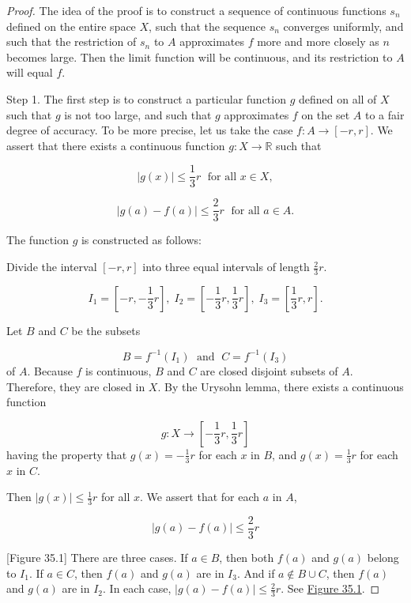 \begin{proof}
 The idea of the proof is to construct a sequence of continuous functions \(s_{n}\) defined on the entire space \(X\), such that the sequence \(s_{n}\) converges uniformly, and such that the restriction of \(s_{n}\) to \(A\) approximates \(f\) more and more closely as \(n\) becomes large. Then the limit function will be continuous, and its restriction to \(A\) will equal \(f\).

Step 1. The first step is to construct a particular function \(g\) defined on all of \(X\) such that \(g\) is not too large, and such that \(g\) approximates \(f\) on the set \(A\) to a fair degree of accuracy. To be more precise, let us take the case \(f : A \rightarrow [ {-r,r}]\). We assert that there exists a continuous function \(g : X \rightarrow \mathbb{R}\) such that

\[
| {g(x) }| \leq \frac{1}{3}r\;\text{ for all }x \in X,
\]

\[
| {g( a) - f( a) }| \leq \frac{2}{3}r\;\text{ for all }a \in A.
\]

The function \(g\) is constructed as follows:

Divide the interval \([ {-r,r}]\) into three equal intervals of length \(\frac{2}{3}r\).

\[
I_{1} = [ {-r, - \frac{1}{3}r}] ,\;I_{2} = [ {-\frac{1}{3}r,\frac{1}{3}r}] ,\;I_{3} = [ {\frac{1}{3}r,r}] .
\]

Let \(B\) and \(C\) be the subsets

\[
B = f^{-1}( I_{1}) \;\text{ and }\;C = f^{-1}( I_{3})
\]
of \(A\). Because \(f\) is continuous, \(B\) and \(C\) are closed disjoint subsets of \(A\). Therefore, they are closed in \(X\). By the Urysohn lemma, there exists a continuous function

\[
g : X \rightarrow [ {-\frac{1}{3}r,\frac{1}{3}r}]
\]
having the property that \(g(x) = - \frac{1}{3}r\) for each \(x\) in \(B\), and \(g(x) = \frac{1}{3}r\) for each \(x\) in \(C\).

Then \(| {g(x) }| \leq \frac{1}{3}r\) for all \(x\). We assert that for each \(a\) in \(A\),

\[
| {g( a) - f( a) }| \leq \frac{2}{3}r
\]


[Figure 35.1]
There are three cases. If \(a \in B\), then both \(f( a)\) and \(g( a)\) belong to \(I_{1}\). If \(a \in C\), then \(f( a)\) and \(g( a)\) are in \(I_{3}\). And if \(a \notin B \cup C\), then \(f( a)\) and \(g( a)\) are in \(I_{2}\). In each case, \(| {g( a) - f( a) }| \leq \frac{2}{3}r\). See \hyperref[fig:35.1]{Figure 35.1}.


\end{proof}
